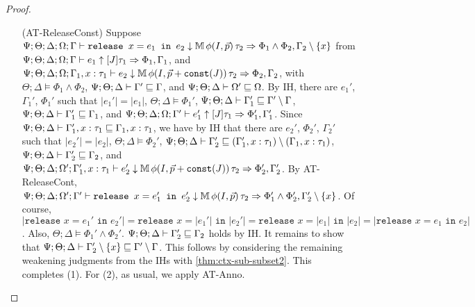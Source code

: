 \begin{proof}
\begin{itemize}
  \item[(AT-ReleaseConst)] Suppose
  $\Psi ; \Theta ; \Delta ; \Omega ; \Gamma \vdash \texttt{release } x = e_1 \texttt{ in }e_2 \downarrow \mathbb{M} \, \phi(I,\vec{p}) \, \tau_2 \Rightarrow \Phi_1 \wedge \Phi_2, \Gamma_2 \setminus \{x\}$ from
  $\Psi ; \Theta ; \Delta ; \Omega ; \Gamma \vdash e_1 \uparrow [J] \tau_1 \Rightarrow \Phi_1,\Gamma_1$, and
  $\Psi ; \Theta ; \Delta ; \Omega ; \Gamma_1, x : \tau_1 \vdash e_2 \downarrow \mathbb{M} \, \phi(I,\vec{p} + \texttt{const}(J)) \, \tau_2 \Rightarrow \Phi_2, \Gamma_2$, with
  $\Theta ; \Delta \vDash \Phi_1 \wedge \Phi_2$,
  $\Psi ; \Theta ; \Delta \vdash \Gamma' \sqsubseteq \Gamma$, and
  $\Psi ; \Theta ; \Delta \vdash \Omega' \sqsubseteq \Omega$.
  By IH, there are $e_1'$, $\Gamma_1'$, $\Phi_1'$ such that
  $|e_1'| = |e_1|$,
  $\Theta ; \Delta \vDash \Phi_1'$,
  $\Psi ; \Theta ; \Delta \vdash \Gamma_1' \sqsubseteq \Gamma' \setminus \Gamma$,
  $\Psi ; \Theta ; \Delta \vdash \Gamma_1' \sqsubseteq \Gamma_1$, and
  $\Psi ; \Theta ; \Delta ; \Omega ; \Gamma' \vdash e_1' \uparrow [J]\tau_1 \Rightarrow \Phi_1',\Gamma_1'$.
  Since $\Psi ; \Theta ; \Delta \vdash \Gamma_1',x : \tau_1 \sqsubseteq \Gamma_1, x : \tau_1$,
  we have by IH that there are $e_2'$, $\Phi_2'$, $\Gamma_2'$ such that
  $|e_2'| = |e_2|$,
  $\Theta ; \Delta \vDash \Phi_2'$,
  $\Psi ; \Theta ; \Delta \vdash \Gamma_2' \sqsubseteq (\Gamma_1',x : \tau_1) \setminus (\Gamma_1, x : \tau_1)$,
  $\Psi ; \Theta ; \Delta \vdash \Gamma_2' \sqsubseteq \Gamma_2$, and
  $\Psi ; \Theta ; \Delta ; \Omega' ; \Gamma_1', x : \tau_1 \vdash e_2' \downarrow \mathbb{M} \, \phi(I,\vec{p} + \texttt{const}(J)) \, \tau_2 \Rightarrow \Phi_2', \Gamma_2'$.
  By AT-ReleaseCont,
  $\Psi ; \Theta ; \Delta ; \Omega' ; \Gamma' \vdash \texttt{release } x = e_1' \texttt{ in }e_2' \downarrow \mathbb{M} \, \phi(I,\vec{p}) \, \tau_2 \Rightarrow \Phi_1' \wedge \Phi_2', \Gamma_2' \setminus \{x\}$.
  Of course, $|\texttt{release } x = e_1' \texttt{ in }e_2'| = \texttt{release } x = |e_1'| \texttt{ in }|e_2'| = \texttt{release } x = |e_1| \texttt{ in }|e_2|
  = |\texttt{release } x = e_1 \texttt{ in }e_2|$.
  Also, $\Theta ; \Delta \vDash \Phi_1' \wedge \Phi_2'$.
  $\Psi ; \Theta ; \Delta \vdash \Gamma_2' \sqsubseteq \Gamma_2$ holds by IH.
  It remains to show that $\Psi ; \Theta ; \Delta \vdash \Gamma_2' \setminus \{x\} \sqsubseteq \Gamma' \setminus \Gamma$.
  This follows by considering the remaining weakening judgments from the IHs with \autoref{thm:ctx-sub-subset2}.
  This completes (1). For (2), as usual, we apply AT-Anno.
  

\end{itemize}
\end{proof}
